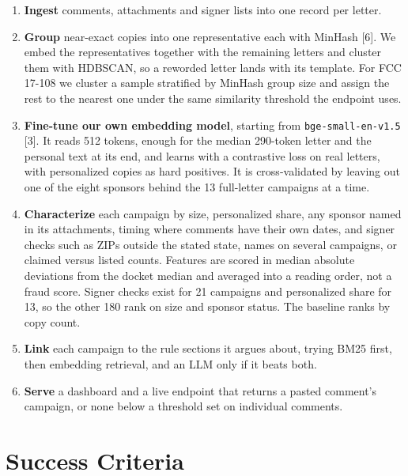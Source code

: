 \documentclass[10pt,twocolumn]{article}
\begin{document}
\begin{enumerate}
  \item \textbf{Ingest} comments, attachments and signer lists into one record per letter.
  \item \textbf{Group} near-exact copies into one representative each with MinHash [6].
        We embed the representatives together with the remaining letters and
        cluster them with HDBSCAN, so a reworded letter lands with its template. For FCC 17-108 we
        cluster a sample stratified by MinHash group size and assign the rest to the nearest one
        under the same similarity threshold the endpoint uses.
  \item \textbf{Fine-tune our own embedding model}, starting from \texttt{bge-small-en-v1.5} [3]. It
        reads 512 tokens, enough for the median 290-token letter and the personal text at its end, and learns with
        a contrastive loss on real letters, with personalized copies as hard positives. It is cross-validated by leaving out one of the eight sponsors behind the 13 full-letter
        campaigns at a time.
  \item \textbf{Characterize} each campaign by size, personalized share, any sponsor named in its
        attachments, timing where comments have their own dates, and signer checks such as ZIPs outside
        the stated state, names on several campaigns, or claimed versus listed counts. Features are scored in median absolute deviations from the docket median and averaged into a reading
        order, not a fraud score.
        Signer checks exist for 21 campaigns and personalized share for 13, so the other 180 rank on size and sponsor status. The baseline ranks by copy count.
  \item \textbf{Link} each campaign to the rule sections it argues about, trying BM25 first, then
        embedding retrieval, and an LLM only if it beats both.
  \item \textbf{Serve} a dashboard and a live endpoint that returns a pasted comment's campaign,
        or none below a threshold set on individual comments.
\end{enumerate}

\section{Success Criteria}
\end{document}
